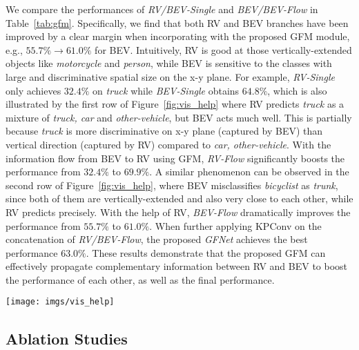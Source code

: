 We compare the performances of \textit{RV/BEV-Single} and \textit{BEV/BEV-Flow} in Table~\ref{tab:gfm}. Specifically, we find that both RV and BEV branches have been improved by a clear margin when incorporating with the proposed GFM module, e.g., $55.7\% \rightarrow 61.0\%$ for BEV. Intuitively, RV is good at those vertically-extended objects like \textit{motorcycle} and \textit{person}, while BEV is sensitive to the classes with large and discriminative spatial size on the x-y plane. For example, \textit{RV-Single} only achieves $32.4\%$ on \textit{truck} while \textit{BEV-Single} obtains $64.8\%$, which is also illustrated by the first row of Figure~\ref{fig:vis_help} where RV predicts \textit{truck} as a mixture of \textit{truck, car} and \textit{other-vehicle}, but BEV acts much well. This is partially because \textit{truck} is more discriminative on x-y plane (captured by BEV) than vertical direction (captured by RV) compared to \textit{car, other-vehicle}. With the information flow from BEV to RV using GFM, \textit{RV-Flow} significantly boosts the performance from $32.4\%$ to $69.9\%$. A similar phenomenon can be observed in the second row of Figure~\ref{fig:vis_help}, where BEV misclassifies \textit{bicyclist} as \textit{trunk}, since both of them are vertically-extended and also very close to each other, while RV predicts precisely. With the help of RV, \textit{BEV-Flow} dramatically improves the performance from $55.7\%$ to $61.0\%$. When further applying KPConv on the concatenation of \textit{RV/BEV-Flow}, the proposed \textit{GFNet} achieves the best performance $63.0\%$. These results demonstrate that the proposed GFM can effectively propagate complementary information between RV and BEV to boost the performance of each other, as well as the final performance.

\begin{figure*}[t]
    \centering
    \texttt{[image: imgs/vis\_help]}
    \caption{Visualization of RV and BEV. The view with the cyan contour helps the one with red. By incorporating both RV and BEV, our GFNet makes more accurate predictions. 
    }
    \label{fig:vis_help}
\end{figure*}






\subsection{Ablation Studies}
\label{sec:ablation}

